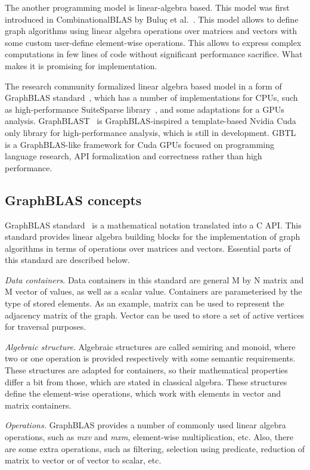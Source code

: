 The another programming model is linear-algebra based. This model was first introduced in CombinationalBLAS by Buluç et al.~\cite{article:combblas}. This model allows to define graph algorithms using linear algebra operations over matrices and vectors with some custom user-define element-wise operations. This allows to express complex computations in few lines of code without significant performance sacrifice. What makes it is promising for implementation. 

The research community formalized linear algebra based model in a form of GraphBLAS standard~\cite{7761646}, which has a number of implementations for CPUs, such as high-performance SuiteSparse library~\cite{10.1145/3322125}, and some adaptations for a GPUs analysis. GraphBLAST~\cite{yang2019graphblast} is GraphBLAS-inspired a template-based Nvidia Cuda only library for high-performance analysis, which is still in development.
GBTL~\cite{7529957} is a GraphBLAS-like framework for Cuda GPUs focused on programming language research, API formalization and correctness rather than high performance. 

\subsection{GraphBLAS concepts}

GraphBLAS standard~\cite{7761646} is a mathematical notation translated into a C API. This standard provides linear algebra building blocks for the implementation of graph algorithms in terms of operations over matrices and vectors. Essential parts of this standard are described below.

\textit{Data containers}. Data containers in this standard are general M by N matrix and M vector of values, as well as a scalar value. Containers are parameterised by the type of stored elements. As an example, matrix can be used to represent the adjacency matrix of the graph. Vector can be used to store a set of active vertices for traversal purposes. 

\textit{Algebraic structure}. Algebraic structures are called semiring and monoid, where two or one operation is provided respectively with some semantic requirements. These structures are adapted for containers, so their mathematical properties differ a bit from those, which are stated in classical algebra. These structures define the element-wise operations, which work with elements in vector and matrix containers. 

\textit{Operations.} GraphBLAS provides a number of commonly used linear algebra operations, such as \textit{mxv} and \textit{mxm}, element-wise multiplication, etc. Also, there are some extra operations, such as filtering, selection using predicate, reduction of matrix to vector or of vector to scalar, etc.

